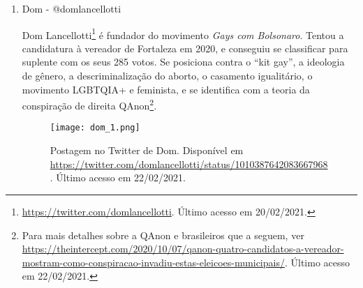 \documentclass[
	12pt,				%
	openright,			%
	twoside,			%
	a4paper,			%
	english,			%
	brazil				%
	]{abntex2}
\begin{document}
\begin{anexosenv}
\begin{enumerate}
 
  
 \item Dom - @domlancellotti
 
 Dom Lancellotti\footnote{\url{https://twitter.com/domlancellotti}. Último acesso em 20/02/2021.} é fundador do movimento \textit{Gays com Bolsonaro}. Tentou a candidatura à vereador de Fortaleza em 2020, e conseguiu se classificar para suplente com os seus 285 votos. Se posiciona contra o ``kit gay'', a ideologia de gênero, a descriminalização do aborto, o casamento igualitário, o movimento LGBTQIA+ e feminista, e se identifica com a teoria da conspiração de direita QAnon\footnote{Para mais detalhes sobre a QAnon e brasileiros que a seguem, ver \url{https://theintercept.com/2020/10/07/qanon-quatro-candidatos-a-vereador-mostram-como-conspiracao-invadiu-estas-eleicoes-municipais/}. Último acesso em 22/02/2021.}.
 
 \begin{figure}[!htbp]
    \centering
    \texttt{[image: dom\_1.png]}
    \caption{Postagem no Twitter de Dom. Disponível em \url{https://twitter.com/domlancellotti/status/1010387642083667968}. Último acesso em 22/02/2021.}
 \end{figure}
 
 
 
 

\end{enumerate}
\end{anexosenv}
\end{document}
